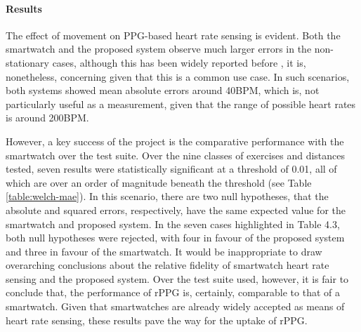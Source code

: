 \paragraph{Results}
The effect of movement on PPG-based heart rate sensing is evident. Both the smartwatch and the proposed system observe much larger errors in the non-stationary cases, although this has 
been widely reported before \cite{souza2019heart}, it is, nonetheless, concerning given that this is a common use case. In such scenarios, both systems showed mean absolute errors around 40BPM,
which is, not particularly useful as a measurement, given that the range of possible heart rates is around 200BPM.
\par
However, a key success of the project is the comparative performance with the smartwatch over the test suite. 
Over the nine classes of exercises and distances tested, seven results were statistically significant at a
threshold of 0.01, all of which are over an order of magnitude beneath the threshold (see Table \ref{table:welch-mae}). 
In this scenario, there are two null hypotheses, that the absolute and squared errors, respectively, have the same expected value for the smartwatch and proposed system. 
In the seven cases highlighted in Table 4.3, both null hypotheses were rejected, with four in favour of the proposed system and three in favour of the smartwatch.
It would be inappropriate to draw overarching conclusions about the relative fidelity of smartwatch heart rate sensing and the proposed system. 
Over the test suite used, however, it is fair to conclude 
that, the performance of rPPG is, certainly, comparable to that of a smartwatch. Given that smartwatches are already widely accepted as means of heart rate sensing, these results pave the way for the uptake of rPPG.


